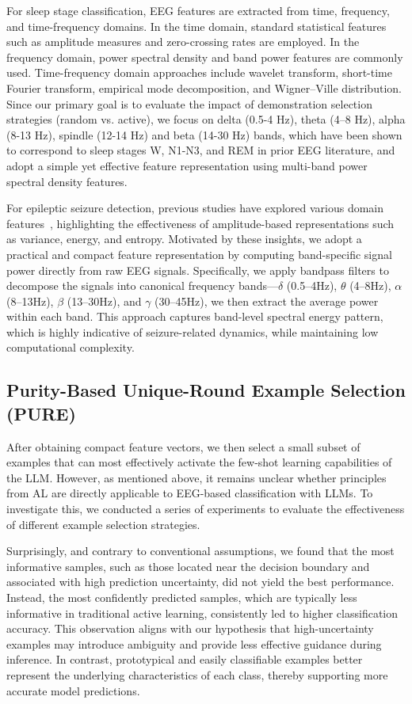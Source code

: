 \documentclass[journal,twocolumn]{IEEEtran}
\begin{document}
For sleep stage classification, EEG features are extracted from time, frequency, and time-frequency domains. In the time domain, standard statistical features such as amplitude measures and zero-crossing rates are employed. In the frequency domain, power spectral density and band power features are commonly used. Time-frequency domain approaches include wavelet transform, short-time Fourier transform, empirical mode decomposition, and Wigner–Ville distribution. Since our primary goal is to evaluate the impact of demonstration selection strategies (random vs. active), we focus on delta (0.5-4 Hz), theta (4–8 Hz), alpha (8-13 Hz), spindle (12-14 Hz) and beta (14-30 Hz) bands, which have been shown to correspond to sleep stages W, N1-N3, and REM in prior EEG literature, and adopt a simple yet effective feature representation using multi-band power spectral density features.

For epileptic seizure detection, previous studies have explored various domain features~\cite{boonyakitanont2020review}, highlighting the effectiveness of amplitude-based representations such as variance, energy, and entropy. Motivated by these insights, we adopt a practical and compact feature representation by computing band-specific signal power directly from raw EEG signals. Specifically, we apply bandpass filters to decompose the signals into canonical frequency bands—$\delta$ (0.5–4Hz), $\theta$ (4–8Hz), $\alpha$ (8–13Hz), $\beta$ (13–30Hz), and $\gamma$ (30–45Hz), we then extract the average power within each band. This approach captures band-level spectral energy pattern, which is highly indicative of seizure-related dynamics, while maintaining low computational complexity.

\subsection{Purity-Based Unique-Round Example Selection (PURE)}
\label{subsec:PURE}

After obtaining compact feature vectors, we then select a small subset of examples that can most effectively activate the few-shot learning capabilities of the LLM. However, as mentioned above, it remains unclear whether principles from AL are directly applicable to EEG-based classification with LLMs. To investigate this, we conducted a series of experiments to evaluate the effectiveness of different example selection strategies.

Surprisingly, and contrary to conventional assumptions, we found that the most informative samples, such as those located near the decision boundary and associated with high prediction uncertainty, did not yield the best performance. Instead, the most confidently predicted samples, which are typically less informative in traditional active learning, consistently led to higher classification accuracy. This observation aligns with our hypothesis that high-uncertainty examples may introduce ambiguity and provide less effective guidance during inference. In contrast, prototypical and easily classifiable examples better represent the underlying characteristics of each class, thereby supporting more accurate model predictions.
\end{document}
